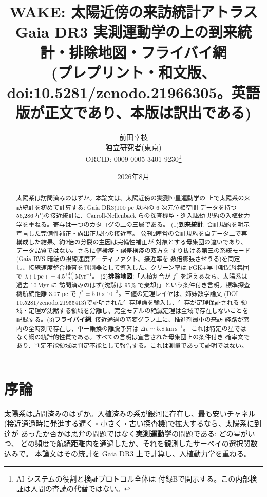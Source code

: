 \documentclass[11pt]{article}
\title{WAKE: 太陽近傍の来訪統計アトラス\\
Gaia DR3 実測運動学の上の到来統計・排除地図・フライバイ網\\[1ex]
\large (プレプリント・和文版、doi:10.5281/zenodo.21966305。英語版が正文であり、本版は訳出である)}
\author{前田幸枝\\
\normalsize 独立研究者(東京)\\
\normalsize ORCID: 0009-0005-3401-9230\thanks{AI システムの役割と検証プロトコル全体は
付録Bで開示する。この内部検証は人間の査読の代替ではない。}}
\date{2026年8月}
\newcommand{\Myr}{\,\mathrm{Myr}}
\newcommand{\pc}{\,\mathrm{pc}}
\newcommand{\kms}{\,\mathrm{km\,s^{-1}}}
\newcommand{\lam}{\lambda}
\begin{document}
\maketitle

\begin{abstract}
\noindent 太陽系は訪問済みのはずか。本論文は、太陽近傍の\textbf{実測}恒星運動学の
上で太陽系の来訪統計を初めて計算する: Gaia DR3(100 pc 以内の 6 次元位相空間
データを持つ 56{,}286 星)の接近統計に、Carroll-Nellenback らの探査機型・進入駆動
規約の入植動力学を重ねる。寄与は一つのカタログの上の三層である。
(1)\textbf{到来統計}: 会計規約を明示宣言した完備性補正・露出正規化の接近率。
公刊2陣営の会計規約を自データ上で再構成した結果、約2倍の分裂の主因は完備性補正が
対象とする母集団の違いであり、データ品質ではない。さらに値検疫・誤差検疫の双方を
すり抜ける第三の系統モード(Gaia RVS 暗端の視線速度アーティファクト。接近率を
数倍膨張させうる)を同定し、接線速度整合検査を判別器として導入した。クリーン率は
FGK+早中期M母集団で $\lam(1\pc)=4.5^{+4.0}_{-2.7}\Myr^{-1}$。
(2)\textbf{排除地図}:「入植割合が $f^*$ を超えるなら、太陽系は過去 10\,Myr に
訪問済みのはず(沈黙は 95\% で棄却)」という条件付き言明。標準探査機航続距離
3.07 pc で $f^*=5.0\times10^{-3}$。三値の定理レイヤは、姉妹数学論文
(DOI 10.5281/zenodo.21955413)で証明された生存理論を輸入し、生存が定理保証される
領域・定理が沈黙する領域を分離し、完全モデルの絶滅定理は全域で存在しないことを
記録する。(3)\textbf{フライバイ網}: 接近通過の時変グラフ上に、推進剤最小の来訪
経路が窓内の全時刻で存在し、単一乗換の離脱予算は $\Delta v\simeq5.8\kms$。
これは特定の星ではなく網の統計的性質である。すべての言明は宣言された母集団上の条件付き
確率文であり、判定不能領域は判定不能として報告する。これは測量であって証明ではない。
\end{abstract}

\tableofcontents

\section{序論}\label{sec:intro}

太陽系は訪問済みのはずか。入植済みの系が銀河に存在し、最も安いチャネル
(接近通過時に発進する遅く・小さく・古い探査機)で拡大するなら、太陽系に到達が
あったか否かは思弁の問題ではなく\textbf{実測運動学}の問題である: どの星がいつ、
どの頻度で航続距離内を通過したか、それを観測したサーベイの選択関数込みで。
本論文はその統計を Gaia DR3 上で計算し、入植動力学を重ねる。
\end{document}
